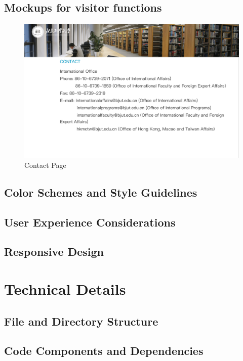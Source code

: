 \documentclass[12pt]{article}
\begin{document}
\subsection{Mockups for visitor functions}

\begin{figure}[H]
    \centering
    \includegraphics[width=\textwidth]{mockups/visitor/contact.png}
    \caption{Contact Page}
    \label{fig:visitor_contact_page}
\end{figure}


\subsection{Color Schemes and Style Guidelines}
\subsection{User Experience Considerations}
\subsection{Responsive Design}

\newpage
\section{Technical Details}
\subsection{File and Directory Structure}
\subsection{Code Components and Dependencies}
\end{document}
